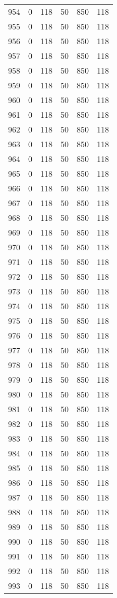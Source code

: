\documentclass[a4paper]{ctexart}
\begin{document}
\begin{longtable}{p{1cm}|p{2cm}|p{2cm}|p{2cm}|P{2cm}|p{2cm}}
		954&0&118&50&850&118\\
		955&0&118&50&850&118\\
		956&0&118&50&850&118\\
		957&0&118&50&850&118\\
		958&0&118&50&850&118\\
		959&0&118&50&850&118\\
		960&0&118&50&850&118\\
		961&0&118&50&850&118\\
		962&0&118&50&850&118\\
		963&0&118&50&850&118\\
		964&0&118&50&850&118\\
		965&0&118&50&850&118\\
		966&0&118&50&850&118\\
		967&0&118&50&850&118\\
		968&0&118&50&850&118\\
		969&0&118&50&850&118\\
		970&0&118&50&850&118\\
		971&0&118&50&850&118\\
		972&0&118&50&850&118\\
		973&0&118&50&850&118\\
		974&0&118&50&850&118\\
		975&0&118&50&850&118\\
		976&0&118&50&850&118\\
		977&0&118&50&850&118\\
		978&0&118&50&850&118\\
		979&0&118&50&850&118\\
		980&0&118&50&850&118\\
		981&0&118&50&850&118\\
		982&0&118&50&850&118\\
		983&0&118&50&850&118\\
		984&0&118&50&850&118\\
		985&0&118&50&850&118\\
		986&0&118&50&850&118\\
		987&0&118&50&850&118\\
		988&0&118&50&850&118\\
		989&0&118&50&850&118\\
		990&0&118&50&850&118\\
		991&0&118&50&850&118\\
		992&0&118&50&850&118\\
		993&0&118&50&850&118\\

\end{longtable}
\end{document}
